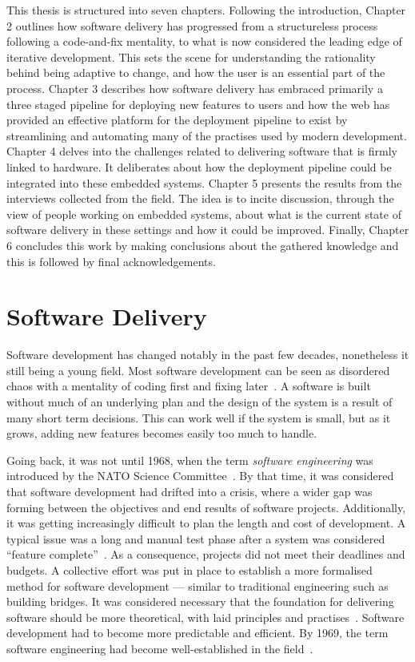 \documentclass[english]{tktltiki2}
\begin{document}
This thesis is structured into seven chapters. Following the introduction, Chapter 2 outlines how software delivery has progressed from a structureless process following a code-and-fix mentality, to what is now considered the leading edge of iterative development. This sets the scene for understanding the rationality behind being adaptive to change, and how the user is an essential part of the process. Chapter 3 describes how software delivery has embraced primarily a three staged pipeline for deploying new features to users and how the web has provided an effective platform for the deployment pipeline to exist by streamlining and automating many of the practises used by modern development. Chapter 4 delves into the challenges related to delivering software that is firmly linked to hardware. It deliberates about how the deployment pipeline could be integrated into these embedded systems. Chapter 5 presents the results from the interviews collected from the field. The idea is to incite discussion, through the view of people working on embedded systems, about what is the current state of software delivery in these settings and how it could be improved. Finally, Chapter 6 concludes this work by making conclusions about the gathered knowledge and this is followed by final acknowledgements.


\section{Software Delivery}

Software development has changed notably in the past few decades, nonetheless it still being a young field. Most software development can be seen as disordered chaos with a mentality of coding first and fixing later~\cite{Boe88, Fow05}. A software is built without much of an underlying plan and the design of the system is a result of many short term decisions. This can work well if the system is small, but as it grows, adding new features becomes easily too much to handle.

Going back, it was not until 1968, when the term \emph{software engineering} was introduced by the NATO Science Committee~\cite{NR69}. By that time, it was considered that software development had drifted into a crisis, where a wider gap was forming between the objectives and end results of software projects. Additionally, it was getting increasingly difficult to plan the length and cost of development. A typical issue was a long and manual test phase after a system was considered “feature complete”~\cite{Fow05}. As a consequence, projects did not meet their deadlines and budgets. A collective effort was put in place to establish a more formalised method for software development — similar to traditional engineering such as building bridges. It was considered necessary that the foundation for delivering software should be more theoretical, with laid principles and practises~\cite{NR69}. Software development had to become more predictable and efficient. By 1969, the term software engineering had become well-established in the field~\cite{BR70}.
\end{document}
